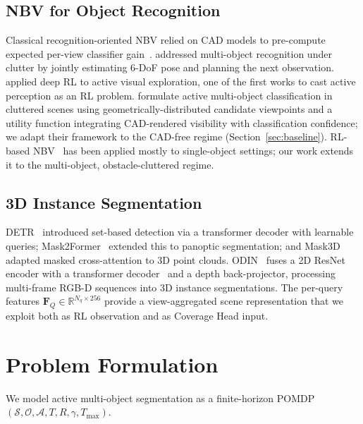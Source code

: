 \documentclass{article}
\begin{document}
\subsection{NBV for Object Recognition}

Classical recognition-oriented NBV relied on CAD models to pre-compute expected per-view classifier gain~\citep{denzler2002information,scott2003view}. \citet{doumanoglou2016recovering} addressed multi-object recognition under clutter by jointly estimating 6-DoF pose and planning the next observation. \citet{jayaraman2018learning} applied deep RL to active visual exploration, one of the first works to cast active perception as an RL problem. \citet{wang2019active} formulate active multi-object classification in cluttered scenes using geometrically-distributed candidate viewpoints and a utility function integrating CAD-rendered visibility with classification confidence; we adapt their framework to the CAD-free regime (Section~\ref{sec:baseline}). RL-based NBV~\citep{nbv_rl_classification} has been applied mostly to single-object settings; our work extends it to the multi-object, obstacle-cluttered regime.

\subsection{3D Instance Segmentation}

DETR~\citep{carion2020detr} introduced set-based detection via a transformer decoder with learnable queries; Mask2Former~\citep{mask2former2022} extended this to panoptic segmentation; and Mask3D~\citep{schult2023mask3d} adapted masked cross-attention to 3D point clouds. ODIN~\citep{odin2024} fuses a 2D ResNet~\citep{he2016resnet} encoder with a transformer decoder~\citep{vaswani2017attention} and a depth back-projector, processing multi-frame RGB-D sequences into 3D instance segmentations. The per-query features $\mathbf{F}_Q \in \mathbb{R}^{N_q \times 256}$ provide a view-aggregated scene representation that we exploit both as RL observation and as Coverage Head input.

\FloatBarrier
\section{Problem Formulation}
\label{sec:formulation}

We model active multi-object segmentation as a finite-horizon POMDP $(\mathcal{S}, \mathcal{O}, \mathcal{A}, T, R, \gamma, T_{\max})$.
\end{document}
